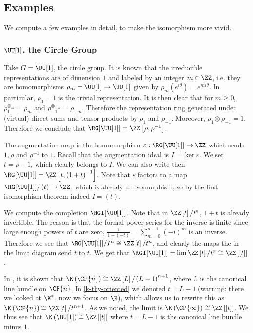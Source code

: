 \subsection{Examples}

We compute a few examples in detail, to make the isomorphism more vivid.

\subsubsection{\texorpdfstring{$\UU[1]$}{U(1)}, the Circle Group}

Take $G = \UU[1]$, the circle group.
It is known that the irreducible representations are of dimension $1$ and labeled by an integer $m \in \ZZ$, i.e. they are homomorphisms $\rho_m = \UU[1] \to \UU[1]$ given by $\rho_m\left(e^{i \theta}\right) = e^{m i \theta}$.
In particular, $\rho_0 = 1$ is the trivial representation.
It is then clear that for $m \geq 0$, $\rho_1^{\otimes_m} = \rho_m$ and $\rho_{-1}^{\otimes_{-m}} = \rho_{-m}$.
Therefore the representation ring generated under (virtual) direct sums and tensor products by $\rho_1$ and $\rho_{-1}$.
Moreover, $\rho_1 \otimes \rho_{-1} = 1$.
Therefore we conclude that $\RG[\UU[1]] = \ZZ\left[\rho, \rho^{-1}\right]$.

The augmentation map is the homomorphism $\varepsilon: \RG[\UU[1]] \to \ZZ$ which sends $1,\rho$ and $\rho^{-1}$ to $1$.
Recall that the augmentation ideal is $I = \ker \varepsilon$.
We set $t = \rho-1$, which clearly belongs to $I$.
We can also write then $\RG[\UU[1]] = \ZZ\left[t, \left(1+t\right)^{-1}\right]$.
Note that $\varepsilon$ factors to a map $\RG[\UU[1]]/\left(t\right) \to \ZZ$, which is already an isomorphism, so by the first isomorphism theorem indeed $I = \left(t\right)$.

We compute the completion $\RGI[{\UU[1]}]$.
Note that in $\ZZ\left[t\right]/t^n$, $1+t$ is already invertible.
The reason is that the formal power series for the inverse is finite since large enough powers of $t$ are zero, $\frac{1}{1-\left(-t\right)} = \sum_{m=0}^{n-1} \left(-t\right)^m$ is an inverse.
Therefore we see that $\RG[\UU[1]]/I^n \cong \ZZ\left[t\right]/t^n$, and clearly the maps the in the limit diagram send $t$ to $t$.
We get that $\RGI[{\UU[1]}] = \lim \ZZ\left[t\right]/t^n \cong \ZZ\left[\left[t\right]\right]$.

In \cite[proposition 2.24]{VB}, it is shown that $\K\left(\CP{n}\right) \cong \ZZ\left[L\right] / \left(L-1\right)^{n+1}$, where $L$ is the canonical line bundle on $\CP{n}$.
In \ref{k-thy-oriented} we denoted $t = L-1$ (warning: there we looked at $\K^*$, now we focus on $\K$), which allows us to rewrite this as $\K\left(\CP{n}\right) \cong \ZZ\left[t\right] / t^{n+1}$.
As we noted, the limit is $\K\left(\CP{\infty}\right) \cong \ZZ\left[\left[t\right]\right]$.
We thus see that $\K\left(\BU[1]\right) \cong \ZZ\left[\left[t\right]\right]$ where $t = L - 1$ is the canonical line bundle minus $1$.

